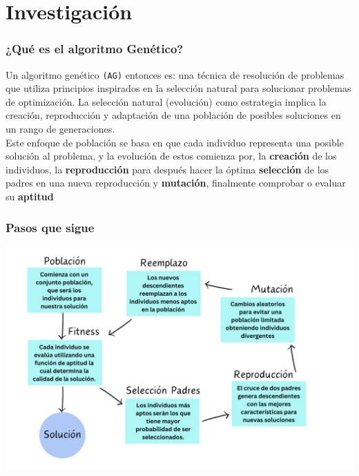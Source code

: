 \section{Investigación}

\subsubsection*{¿Qué es el algoritmo Genético?}

Un algoritmo genético \texttt{(AG)} entonces es: una técnica de resolución de problemas 
que utiliza principios inspirados en la selección natural para solucionar problemas de 
optimización. La selección natural (evolución) como estrategia implica la creación, 
reproducción y adaptación de una población de posibles soluciones en un rango de generaciones.\\ 

Este enfoque de población se basa en que cada individuo representa una posible solución 
al problema, y la evolución de estos comienza por, la \textbf{creación} de los individuos, 
la \textbf{reproducción} para después hacer la óptima \textbf{selección} de los padres en 
una nueva reproducción y \textbf{mutación}, finalmente comprobar o evaluar su \textbf{aptitud}\\ 


\subsubsection*{Pasos que sigue}

\begin{center}
    \includegraphics[scale = .35]{IMA/algo genetico.png}
\end{center}

